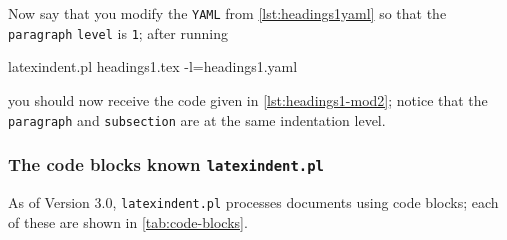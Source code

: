 	Now say that you modify the \texttt{YAML} from \cref{lst:headings1yaml} so that the \texttt{paragraph} \texttt{level} is \texttt{1}; after
	running
	\begin{commandshell}
latexindent.pl headings1.tex -l=headings1.yaml
\end{commandshell}
	you should now receive the code given in \cref{lst:headings1-mod2}; notice that
	the \texttt{paragraph} and \texttt{subsection} are at the same indentation level.

    \subsubsection{The code blocks known \texttt{latexindent.pl}}\label{subsubsec:code-blocks}
	As of Version 3.0, \texttt{latexindent.pl} processes documents using code blocks; each
	of these are shown in \cref{tab:code-blocks}.

